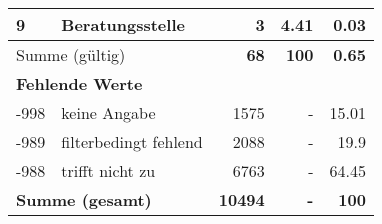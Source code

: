 \begin{longtable}{lXrrr}
     9 &
     \multicolumn{1}{X}{ Beratungsstelle   } &


       \num{3} &
       \num[round-mode=places,round-precision=2]{4,41} &
         \num[round-mode=places,round-precision=2]{0,03} \\
     \midrule
     \multicolumn{2}{l}{Summe (gültig)} &
       \textbf{\num{68}} &
     \textbf{100} &
       \textbf{\num[round-mode=places,round-precision=2]{0,65}} \\
     \multicolumn{5}{l}{\textbf{Fehlende Werte}}\\
       -998 &
       keine Angabe &
         \num{1575} &
        - &
         \num[round-mode=places,round-precision=2]{15,01} \\
       -989 &
       filterbedingt fehlend &
         \num{2088} &
        - &
         \num[round-mode=places,round-precision=2]{19,9} \\
       -988 &
       trifft nicht zu &
         \num{6763} &
        - &
         \num[round-mode=places,round-precision=2]{64,45} \\
     \midrule
     \multicolumn{2}{l}{\textbf{Summe (gesamt)}} &
          \textbf{\num{10494}} &
        \textbf{-} &
        \textbf{100} \\
     \bottomrule
     \end{longtable}
     
